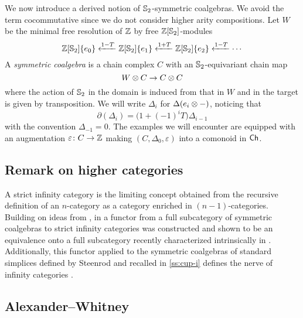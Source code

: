 We now introduce a derived notion of $\mathbb{S}_2$-symmetric coalgebras.
We avoid the term cocommutative since we do not consider higher arity compositions.
Let $W$ be the minimal free resolution of $\mathbb{Z}$ by free $\mathbb{Z}[\mathbb{S}_2]$-modules
\[
\mathbb{Z}[\mathbb{S}_2]\{e_0\} \xleftarrow{1-T} \mathbb{Z}[\mathbb{S}_2]\{e_1\} \xleftarrow{1+T} \mathbb{Z}[\mathbb{S}_2]\{e_2\} \xleftarrow{1-T} \dotsb
\]
A \textit{symmetric coalgebra} is a chain complex $C$ with an $\mathbb{S}_2$-equivariant chain map
\[
W \otimes C \to C \otimes C
\]
where the action of $\mathbb{S}_2$ in the domain is induced from that in $W$ and in the target is given by transposition.
We will write $\Delta_i$ for $\Delta(e_i \otimes -)$, noticing that
\[
\partial(\Delta_i) = \big( 1+(-1)^i T \big) \Delta_{i-1}
\]
with the convention $\Delta_{-1} = 0$.
The examples we will encounter are equipped with an augmentation $\varepsilon \colon C \to \mathbb{Z}$ making $(C, \Delta_0, \varepsilon)$ into a comonoid in $\mathsf{Ch}$.

\subsection{Remark on higher categories}
\label{ss:higher categories}

A strict infinity category is the limiting concept obtained from the recursive definition of an $n$-category as a category enriched in $(n-1)$-categories.
Building on ideas from \cite{brown1981cubes, kapranov1991polycategory, steiner2004omega}, in \cite{medina2020globular} a functor from a full subcategory of symmetric coalgebras to strict infinity categories was constructed and shown to be an equivalence onto a full subcategory recently characterized intrinsically in \cite{ozornova2022steiner}.
Additionally, this functor applied to the symmetric coalgebras of standard simplices defined by Steenrod and recalled in \cref{ss:cup-i} defines the nerve of infinity categories \cite{street1987orientals}.




\subsection{Alexander--Whitney} \label{ss:aw}


